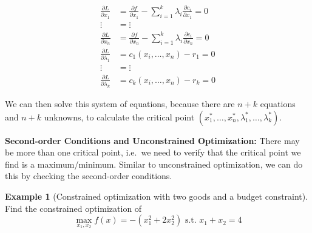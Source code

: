 \documentclass[
]{book}
\theoremstyle{definition}
\theoremstyle{definition}
\newtheorem{example}{Example}[chapter]
\theoremstyle{definition}
\theoremstyle{definition}
\theoremstyle{remark}
\begin{document}
\begin{align*}
\frac{\partial L}{\partial x_1} &= \frac{\partial f}{\partial x_1} - \sum_{i = 1}^k\lambda_i\frac{\partial c_i}{\partial x_1} = 0\\
 \vdots &= \vdots \nonumber \\ 
\frac{\partial L}{\partial x_n}  &= \frac{\partial f}{\partial x_n} - \sum_{i = 1}^k\lambda_i\frac{\partial c_i}{\partial x_n} = 0\\
\frac{\partial L}{\partial \lambda_1} &= c_1(x_i, \dots, x_n) - r_1 =  0\\
 \vdots &= \vdots \nonumber \\
\frac{\partial L}{\partial \lambda_k} &= c_k(x_i, \dots, x_n) - r_k = 0
\end{align*}

We can then solve this system of equations, because there are \(n+k\) equations and \(n+k\) unknowns, to calculate the critical point \((x_1^*,\dots,x_n^*,\lambda_1^*,\dots,\lambda_k^*)\).

\textbf{Second-order Conditions and Unconstrained Optimization:} There may be more than one critical point, i.e.~we need to verify that the critical point we find is a maximum/minimum. Similar to unconstrained optimization, we can do this by checking the second-order conditions.

\begin{example}[Constrained optimization with two goods and a budget constraint]
\protect\hypertarget{exm:unnamed-chunk-247}{}{\label{exm:unnamed-chunk-247} {} }
Find the constrained optimization of
\[\max_{x_1,x_2} f(x) = -(x_1^2 + 2x_2^2) \text{ s.t. } x_1 + x_2 = 4\]
\end{example}
\end{document}
